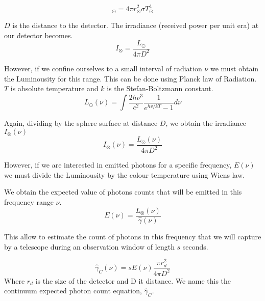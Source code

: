 \documentclass[notitlepage]{article}
\begin{document}
\begin{equation}
_{\odot} = 4 \pi r_{\odot}^2 \sigma T_\odot^4
\end{equation}

$D$ is the distance to the detector. The irradiance (received power per unit era) at our detector becomes.
\begin{equation}
I_{\otimes}= \frac{L_{\odot} }{4 \pi D^2}
\label{eq:irradiance}
\end{equation}

However, if we confine ourselves to a small interval of radiation $\nu$ we must obtain the Luminousity for this range. This can be done using Planck law of Radiation. $T$ is absolute temperature and $k$ is the Stefan-Boltzmann constant.
\begin{equation}
L_{\odot}(\nu)= \int \frac{2h\nu^3}{c^2} \frac{1}{e^{hv / kT}-1} d\nu
\end{equation}

Again, dividing by the sphere surface at distance $D$, we obtain the irradiance $I_{\otimes}(\nu)$
\begin{equation}
I_{\otimes}(\nu) =\frac{ L_{\odot}(\nu)}{4\pi D^2}
\end{equation}

However, if we are interested in emitted photons for a specific frequency, $E(\nu) $ we must divide the Luminousity by the colour temperature using Wiens law.


We obtain the expected value of photons counts that will be emitted in this frequency range $\nu$.
\begin{equation}
E(\nu) = \frac{L_{\otimes}(\nu)}{\hat{\gamma}(\nu)}
\label{eq:expected-count-at-distance}
\end{equation}

This allow to estimate the count of photons in this frequency that we will capture by a telescope during an observation window of length $s$ seconds. 

\begin{equation}
\hat{\gamma}_C(\nu) = s E(\nu)\frac{\pi r_d^2  }{4\pi D^2} 
\label{eq:gammaC}
\end{equation}
Where $r_d$ is the size of the detector and D it distance. We name this the continuum expected photon count equation, $\hat{\gamma}_C$.
\end{document}
